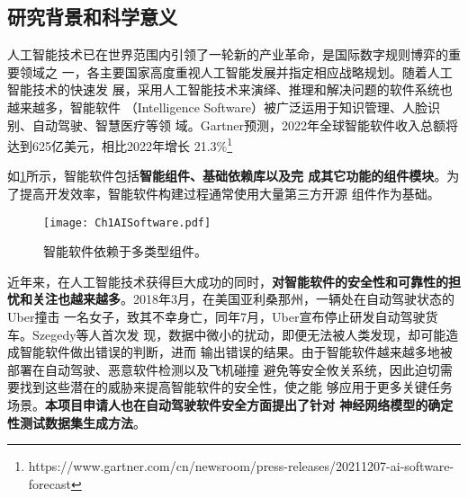 
\subsection{研究背景和科学意义}



%
人工智能技术已在世界范围内引领了一轮新的产业革命，是国际数字规则博弈的重要领域之
一，各主要国家高度重视人工智能发展并指定相应战略规划。随着人工智能技术的快速发
展，采用人工智能技术来演绎、推理和解决问题的软件系统也越来越多，智能软件
（Intelligence Software）被广泛运用于知识管理、人脸识别、自动驾驶、智慧医疗等领
域。Gartner预测，2022年全球智能软件收入总额将达到625亿美元，相比2022年增长
21.3\%\footnote{https://www.gartner.com/cn/newsroom/press-releases/20211207-ai-software-forecast}


如\cref{fig:ch1:aisoftware}所示，智能软件包括\textbf{智能组件、基础依赖库以及完
成其它功能的组件模块}。为了提高开发效率，智能软件构建过程通常使用大量第三方开源
组件作为基础。
\begin{figure}[htp]
    \centering
    \texttt{[image: Ch1AISoftware.pdf]}
    \caption{智能软件依赖于多类型组件。}
    \label{fig:ch1:aisoftware}
\end{figure}

近年来，在人工智能技术获得巨大成功的同时，\textbf{对智能软件的安全性和可靠性的担
忧和关注也越来越多}。2018年3月，在美国亚利桑那州，一辆处在自动驾驶状态的Uber撞击
一名女子，致其不幸身亡，同年7月，Uber宣布停止研发自动驾驶货车。Szegedy等人首次发
现，数据中微小的扰动，即便无法被人类发现，却可能造成智能软件做出错误的判断，进而
输出错误的结果。由于智能软件越来越多地被部署在自动驾驶、恶意软件检测以及飞机碰撞
避免等安全攸关系统，因此迫切需要找到这些潜在的威胁来提高智能软件的安全性，使之能
够应用于更多关键任务场景。\textbf{本项目申请人也在自动驾驶软件安全方面提出了针对
神经网络模型的确定性测试数据集生成方法}。

